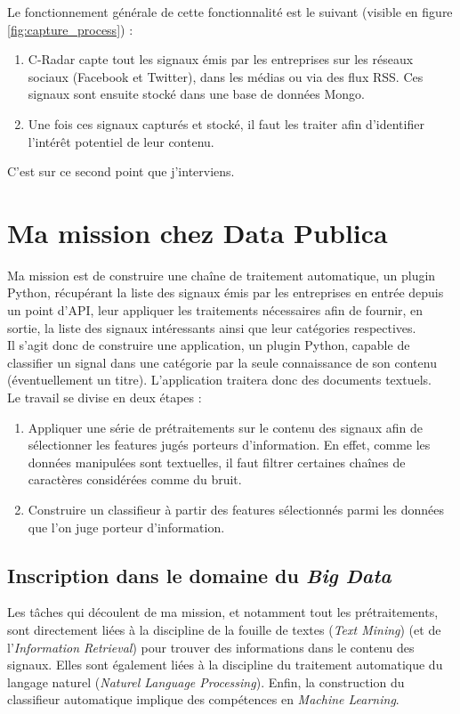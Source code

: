     Le fonctionnement générale de cette fonctionnalité est le suivant (visible en figure \ref{fig:capture_process}) :
    \begin{enumerate}
        \item C-Radar capte tout les signaux émis par les entreprises sur les réseaux sociaux (Facebook et Twitter), dans les médias ou via des flux RSS. Ces signaux sont ensuite stocké dans une base de données Mongo.
        \item Une fois ces signaux capturés et stocké, il faut les traiter afin d'identifier l'intérêt potentiel de leur contenu.
    \end{enumerate}
    C'est sur ce second point que j'interviens.

\section{Ma mission chez Data Publica} %
\label{sec:ma_mission_chez_data_publica}
    Ma mission est de construire une chaîne de traitement automatique, un plugin Python, récupérant la liste des signaux émis par les entreprises en entrée depuis un point d'API, leur appliquer les traitements nécessaires afin de fournir, en sortie, la liste des signaux intéressants ainsi que leur catégories respectives.\\

    Il s'agit donc de construire une application, un plugin Python, capable de classifier un signal dans une catégorie par la seule connaissance de son contenu (éventuellement un titre). L'application traitera donc des documents textuels.\\
    Le travail se divise en deux étapes :
    \begin{enumerate}
        \item Appliquer une série de prétraitements sur le contenu des signaux afin de sélectionner les features jugés porteurs d'information. En effet, comme les données manipulées sont textuelles, il faut filtrer certaines chaînes de caractères considérées comme du bruit.
        \item Construire un classifieur à partir des features sélectionnés parmi les données que l'on juge porteur d'information.
    \end{enumerate}

    \subsection{Inscription dans le domaine du \textit{Big Data}}
        Les tâches qui découlent de ma mission, et notamment tout les prétraitements, sont directement liées à la discipline de la fouille de textes (\textit{Text Mining}) (et de l'\textit{Information Retrieval}) pour trouver des informations dans le contenu des signaux. Elles sont également liées à la discipline du traitement automatique du langage naturel (\textit{Naturel Language Processing}). Enfin, la construction du classifieur automatique implique des compétences en \textit{Machine Learning}.\\

